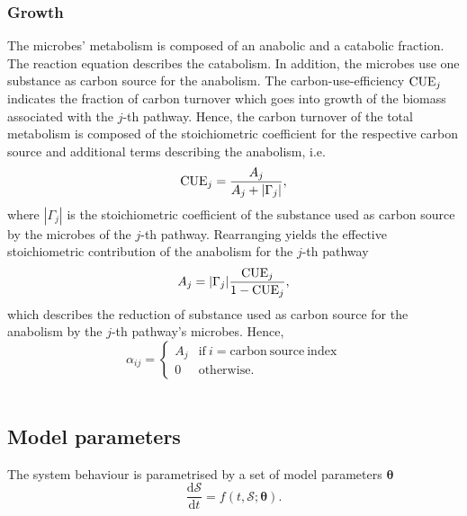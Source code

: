 \documentclass{article}
\begin{document}
\subsubsection{Growth}

The microbes' metabolism is composed of an anabolic and a catabolic fraction.
The reaction equation describes the catabolism. 
In addition, the microbes use one substance as carbon source for the anabolism.
The carbon-use-efficiency $\mathrm{CUE}_j$ indicates the fraction of carbon turnover which goes into growth of the biomass associated with the $j$-th pathway.
Hence, the carbon turnover of the total metabolism is composed of the stoichiometric coefficient for the respective carbon source and additional terms describing the anabolism, i.e.
\begin{equation}
\mathrm{CUE}_j = \frac{A_j}{A_j + |\Gamma_j|}, 
\end{equation}
where $|\Gamma_j|$ is the stoichiometric coefficient of the substance used as carbon source by the microbes of the $j$-th pathway.
Rearranging yields the effective stoichiometric contribution of the anabolism for the $j$-th pathway
\begin{equation}
A_{j} = |\Gamma_j| \frac{\mathrm{CUE}_j}{1 - \mathrm{CUE}_j},
\end{equation}
which describes the reduction of substance used as carbon source for the anabolism by the $j$-th pathway's microbes.
Hence, 
\begin{equation}
\alpha_{ij} = \begin{cases} A_j & \mathrm{if}\ i = \mathrm{carbon\ source\ index}\\
                        0 & \mathrm{otherwise}.
            \end{cases}
\end{equation}
\\


\subsection{Model parameters}

The system behaviour is parametrised by a set of model parameters $\bm{\theta}$
\begin{equation}
\frac{\mathrm{d} \mathcal{S}}{\mathrm{d}t} = f(t, \mathcal{S}; \bm{\theta}).
\end{equation}
\end{document}
